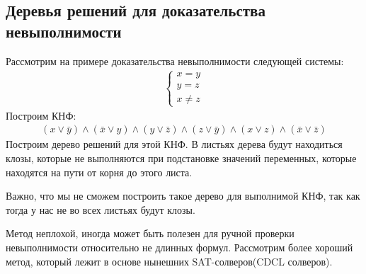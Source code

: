 \subsection{Деревья решений для доказательства невыполнимости}
Рассмотрим на примере доказательства невыполнимости следующей системы: 
\begin{gather*}
    \begin{cases}
        x = y \\
        y = z \\
        x \neq z
    \end{cases}
\end{gather*} 
Построим КНФ:
\begin{gather*}
    (x \lor \bar y) \land (\bar x \lor y) \land (y \lor \bar z) \land (z \lor \bar y) \land (x \lor z) \land (\bar x \lor \bar z)
\end{gather*}
Построим дерево решений для этой КНФ. В листьях дерева будут находиться клозы, которые не выполняются при подстановке значений переменных, которые находятся  
на пути от корня до этого листа. 
\begin{center}
\end{center}
Важно, что мы не сможем построить такое дерево для выполнимой КНФ, так как тогда у нас не во всех листьях будут клозы. 

Метод неплохой, иногда может быть полезен для ручной проверки невыполнимости относительно не длинных формул. 
Рассмотрим более хороший метод, который лежит в основе нынешних SAT-солверов(CDCL солверов). 
